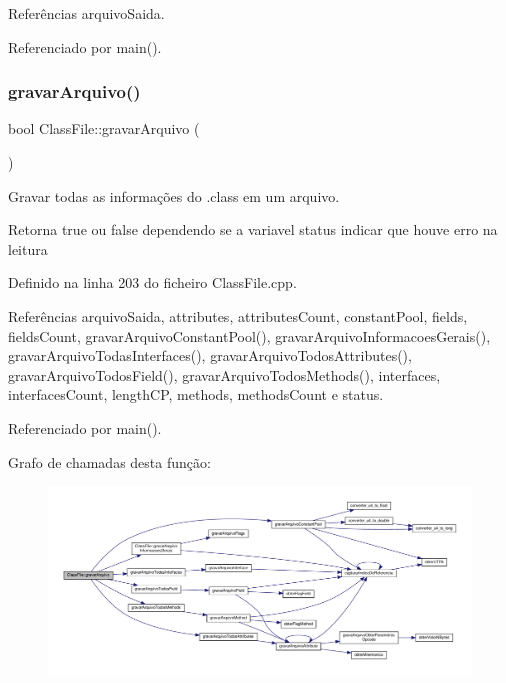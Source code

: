 Referências arquivo\+Saida.



Referenciado por main().

\mbox{\label{classClassFile_a452169cb59d63012f98a34a3fff2c2f7}} 
\subsubsection{\texorpdfstring{gravar\+Arquivo()}{gravarArquivo()}}
{\footnotesize\ttfamily bool Class\+File\+::gravar\+Arquivo (\begin{DoxyParamCaption}{ }\end{DoxyParamCaption})}



Gravar todas as informações do .class em um arquivo. 

\begin{DoxyReturn}{Retorna}
true ou false dependendo se a variavel status indicar que houve erro na leitura 
\end{DoxyReturn}


Definido na linha 203 do ficheiro Class\+File.\+cpp.



Referências arquivo\+Saida, attributes, attributes\+Count, constant\+Pool, fields, fields\+Count, gravar\+Arquivo\+Constant\+Pool(), gravar\+Arquivo\+Informacoes\+Gerais(), gravar\+Arquivo\+Todas\+Interfaces(), gravar\+Arquivo\+Todos\+Attributes(), gravar\+Arquivo\+Todos\+Field(), gravar\+Arquivo\+Todos\+Methods(), interfaces, interfaces\+Count, length\+CP, methods, methods\+Count e status.



Referenciado por main().

Grafo de chamadas desta função\+:\nopagebreak
\begin{figure}[H]
\begin{center}
\leavevmode
\includegraphics[width=350pt]{classClassFile_a452169cb59d63012f98a34a3fff2c2f7_cgraph}
\end{center}
\end{figure}
\mbox{\label{classClassFile_a4a685afd10dc5aaacd5a71ed535895c6}} 
